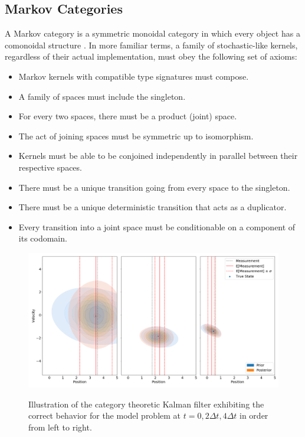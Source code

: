\documentclass[letterpaper, 10 pt, conference]{ieeeconf}  %
\begin{document}
\subsection{Markov Categories}
A Markov category is a symmetric monoidal category in which every object has a comonoidal structure \cite{fritz}.
In more familiar terms, a family of stochastic-like kernels, regardless of their actual implementation, must obey the following set of axioms:

\begin{itemize}
    \item Markov kernels with compatible type signatures must compose.
    \item A family of spaces must include the singleton.
    \item For every two spaces, there must be a product (joint) space.
    \item The act of joining spaces must be symmetric up to isomorphism.
    \item Kernels must be able to be conjoined independently in parallel between their respective spaces.
    \item There must be a unique transition going from every space to the singleton.
    \item There must be a unique deterministic transition that acts as a duplicator.
    \item Every transition into a joint space must be conditionable on a component of its codomain.
\end{itemize}

\begin{figure}[h]
    \centering
    \includegraphics[width=\linewidth]{simulation_results.png}
    \label{simulation-results}
    \caption{Illustration of the category theoretic Kalman filter exhibiting the correct behavior for the model problem at $t=0, 2\Delta t, 4\Delta t$ in order from left to right.}
\end{figure}
\end{document}
